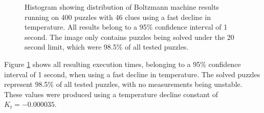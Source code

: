 \documentclass[a4paper,11pt]{kth-mag}
\begin{document}
\begin{figure}[here] 
\noindent{}
\vspace{-15pt}
\caption{Histogram showing distribution of Boltzmann machine results running on 400 puzzles with 46 clues using a fast decline in temperature. All results belong to a 95\% confidence interval of 1 second. The image only contains puzzles being solved under the 20 second limit, which were 98.5\% of all tested puzzles.}
\label{fig:boltzmannFast}
\end{figure}

Figure \ref{fig:boltzmannFast} shows all resulting execution times, belonging to a 95\% confidence interval of 1 second, when using a fast decline in temperature.
The solved puzzles represent 98.5\% of all tested puzzles, with no measurements being unstable.
These values were produced using a temperature decline constant of $K_t = -0.000035$.
\end{document}
